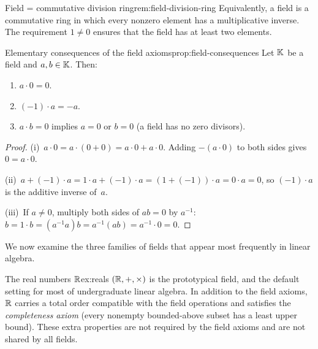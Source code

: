 \begin{remark}{Field = commutative division ring}{rem:field-division-ring}
Equivalently, a field is a commutative ring in which every nonzero element
has a multiplicative inverse. The requirement $1\neq 0$ ensures that the
field has at least two elements.
\end{remark}

\begin{proposition}{Elementary consequences of the field axioms}{prop:field-consequences}
Let ${\mathbb{K}}$ be a field and $a,b\in{\mathbb{K}}$. Then:
\begin{enumerate}[label=(\roman*)]
  \item $a\cdot 0 = 0$.
  \item $(-1)\cdot a = -a$.
  \item $a\cdot b = 0$ implies $a=0$ or $b=0$
    (a field has no zero divisors).
\end{enumerate}
\end{proposition}

\begin{proof}
(i)~$a\cdot 0 = a\cdot(0+0)=a\cdot 0 + a\cdot 0$. Adding $-(a\cdot 0)$ to
both sides gives $0 = a\cdot 0$.

(ii)~$a + (-1)\cdot a = 1\cdot a + (-1)\cdot a = (1+(-1))\cdot a = 0\cdot a
= 0$, so $(-1)\cdot a$ is the additive inverse of~$a$.

(iii)~If $a\neq 0$, multiply both sides of $ab=0$ by $a^{-1}$:
$b = 1\cdot b = (a^{-1}a)b = a^{-1}(ab) = a^{-1}\cdot 0 = 0$.
\end{proof}

We now examine the three families of fields that appear most frequently in
linear algebra.

\begin{example}{The real numbers ${\mathbb{R}}$}{ex:reals}
$({\mathbb{R}},+,\times)$ is the prototypical field, and the default setting for
most of undergraduate linear algebra. In addition to the field axioms,
${\mathbb{R}}$ carries a total order compatible with the field operations and
satisfies the \emph{completeness axiom} (every nonempty bounded-above
subset has a least upper bound). These extra properties are not required
by the field axioms and are not shared by all fields.
\end{example}

